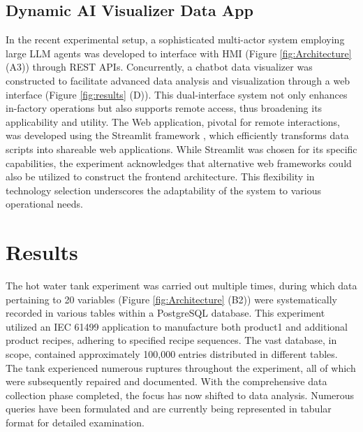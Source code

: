\documentclass[conference]{IEEEtran}
\begin{document}
\subsection{Dynamic AI Visualizer Data App}

In the recent experimental setup, a sophisticated multi-actor system employing large LLM agents was developed to interface with HMI (Figure \ref{fig:Architecture} (A3)) through REST APIs. Concurrently, a chatbot data visualizer was constructed to facilitate advanced data analysis and visualization through a web interface (Figure \ref{fig:results} (D)). This dual-interface system not only enhances in-factory operations but also supports remote access, thus broadening its applicability and utility. The Web application, pivotal for remote interactions, was developed using the Streamlit framework \cite{streamlit2023homepage}, which efficiently transforms data scripts into shareable web applications. While Streamlit was chosen for its specific capabilities, the experiment acknowledges that alternative web frameworks could also be utilized to construct the frontend architecture. This flexibility in technology selection underscores the adaptability of the system to various operational needs.



\section{Results}

The hot water tank experiment was carried out multiple times, during which data pertaining to 20 variables (Figure \ref{fig:Architecture} (B2)) were systematically recorded in various tables within a PostgreSQL database. This experiment utilized an IEC 61499 application to manufacture both product1 and additional product recipes, adhering to specified recipe sequences. The vast database, in scope, contained approximately 100,000 entries distributed in different tables. The tank experienced numerous ruptures throughout the experiment, all of which were subsequently repaired and documented. With the comprehensive data collection phase completed, the focus has now shifted to data analysis. Numerous queries have been formulated and are currently being represented in tabular format for detailed examination.
\end{document}
